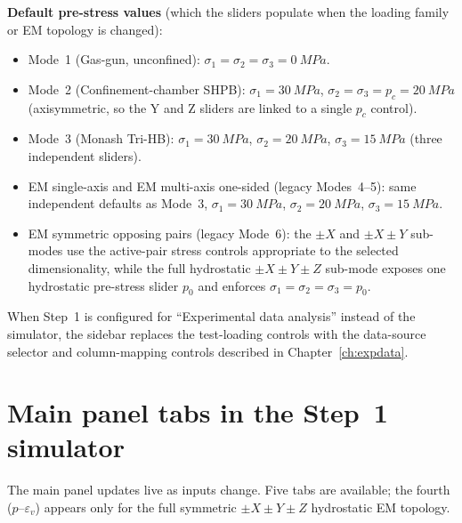 \documentclass[11pt,a4paper,openany]{book}
\providecommand{\SI}[2]{\qty{#1}{#2}}
\theoremstyle{handbook}
\newcommand{\sig}{\sigma}
\newcommand{\eps}{\varepsilon}
\begin{document}
\begin{description}[leftmargin=2em,style=nextline]
    \medskip\noindent
    \textbf{Default pre-stress values} (which the sliders populate when
    the loading family or EM topology is changed):
    \begin{itemize}[leftmargin=1.5em,itemsep=2pt]
      \item Mode~1 (Gas-gun, unconfined):
            $\sig_1=\sig_2=\sig_3=\SI{0}{MPa}$.
      \item Mode~2 (Confinement-chamber SHPB):
            $\sig_1=\SI{30}{MPa}$, $\sig_2=\sig_3=p_c=\SI{20}{MPa}$
            (axisymmetric, so the Y and Z sliders are linked to a
            single $p_c$ control).
      \item Mode~3 (Monash Tri-HB):
            $\sig_1=\SI{30}{MPa}$, $\sig_2=\SI{20}{MPa}$,
            $\sig_3=\SI{15}{MPa}$ (three independent sliders).
      \item EM single-axis and EM multi-axis one-sided (legacy Modes~4--5):
            same independent defaults as Mode~3,
            $\sig_1=\SI{30}{MPa}$, $\sig_2=\SI{20}{MPa}$,
            $\sig_3=\SI{15}{MPa}$.
      \item EM symmetric opposing pairs (legacy Mode~6): the $\pm X$ and
            $\pm X\pm Y$ sub-modes use the active-pair stress controls
            appropriate to the selected dimensionality, while the full
            hydrostatic $\pm X\pm Y\pm Z$ sub-mode exposes one hydrostatic
            pre-stress slider $p_0$ and enforces
            $\sig_1=\sig_2=\sig_3=p_0$.
    \end{itemize}
\end{description}

When Step~1 is configured for ``Experimental data analysis'' instead of
the simulator, the sidebar replaces the test-loading controls with the
data-source selector and column-mapping controls described in
Chapter~\ref{ch:expdata}.

\section{Main panel tabs in the Step~1 simulator}

The main panel updates live as inputs change. Five tabs are available; the
fourth ($p$--$\eps_v$) appears only for the full symmetric
$\pm X\pm Y\pm Z$ hydrostatic EM topology.
\end{document}
